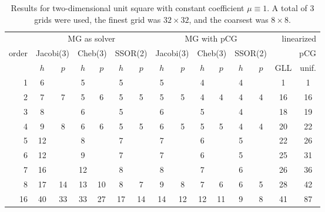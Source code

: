 \documentclass[smallcondensed,final]{svjour3}     %
\begin{document}
\begin{table}
  \caption{\label{tab:box} Results for two-dimensional unit square
    with constant coefficient $\mu\equiv 1$.  A total of 3 grids were
    used, the finest grid was $32\times 32$, and the coarsest was
    $8\times 8$.}
  \centering
  \begin{tabular}{|r|c c|c c|c c||c c|c c|c c||c c|} 
    \hline
    & \multicolumn{6}{c||}{MG as solver} & \multicolumn{6}{c||}{MG with pCG} & \multicolumn{2}{r|}{linearized} \\
    \cline{2-13}
    \!\!\! order \!\!\!\! &  \multicolumn{2}{c|}{\!\scriptsize  Jacobi(3)\!} &  \multicolumn{2}{c|}{\!\scriptsize Cheb(3)\!} & \multicolumn{2}{c||}{\!\scriptsize  SSOR(2)\!} & \multicolumn{2}{c|}{\!\scriptsize Jacobi(3)\!} &  \multicolumn{2}{c|}{\!\scriptsize Cheb(3)\!} & \multicolumn{2}{c||}{\!\scriptsize SSOR(2)\!} & \multicolumn{2}{r|}{pCG}\\
\hline
 & $h$ & $p$ & $h$ & $p$& $h$ & $p$& $h$ & $p$& $h$ & $p$& $h$ & $p$& GLL & unif.\\
 \cline{2-15}
1 & 6 & & 5 & & 5 & & 5 & & 4 & & 4 & & 1 & 1  \\
2 & 7 & 7 & 5 & 6 & 5 & 5 & 5 & 5 & 4 & 4 & 4 & 4 & 16 & 16 \\
3 & 8 & & 6 & & 5 & & 6 & & 5 & & 4 & & 18 & 19  \\
4 & 9 & 8 & 6 & 6 & 5 & 5 & 6 & 5 & 5 & 5 & 4 & 4 & 20 & 22 \\
5 & 12 & & 8 & & 7 & & 7 & & 6 & & 5 & & 22 & 26  \\
6 & 12 & & 9 & & 7 & & 7 & & 6 & & 5 & & 25 & 31  \\
7 & 16 & & 12 & & 8 & & 8 & & 7 & & 6 & & 26 & 36  \\
8 & 17 & 14 & 13 & 10 & 8 & 7 & 9 & 8 & 7 & 6 & 6 & 5 & 28 & 42 \\
16 & 40 & 33 & 33 & 27 & 17 & 14 & 14 & 12 & 12 & 11 & 9 & 8 & 41 & 87 \\
\hline
  \end{tabular}
\end{table}
\end{document}
